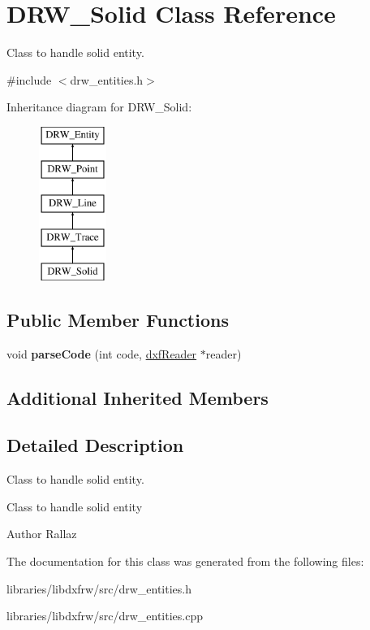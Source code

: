 \hypertarget{classDRW__Solid}{\section{D\-R\-W\-\_\-\-Solid Class Reference}
\label{classDRW__Solid}
}


Class to handle solid entity.  




{\ttfamily \#include $<$drw\-\_\-entities.\-h$>$}

Inheritance diagram for D\-R\-W\-\_\-\-Solid\-:\begin{figure}[H]
\begin{center}
\leavevmode
\includegraphics[height=5.000000cm]{classDRW__Solid}
\end{center}
\end{figure}
\subsection*{Public Member Functions}
\begin{DoxyCompactItemize}
\item 
\hypertarget{classDRW__Solid_a6afdf664e6245381382d2646d52d0638}{void {\bfseries parse\-Code} (int code, \hyperlink{classdxfReader}{dxf\-Reader} $\ast$reader)}\label{classDRW__Solid_a6afdf664e6245381382d2646d52d0638}

\end{DoxyCompactItemize}
\subsection*{Additional Inherited Members}


\subsection{Detailed Description}
Class to handle solid entity. 

Class to handle solid entity \begin{DoxyAuthor}{Author}
Rallaz 
\end{DoxyAuthor}


The documentation for this class was generated from the following files\-:\begin{DoxyCompactItemize}
\item 
libraries/libdxfrw/src/drw\-\_\-entities.\-h\item 
libraries/libdxfrw/src/drw\-\_\-entities.\-cpp\end{DoxyCompactItemize}
